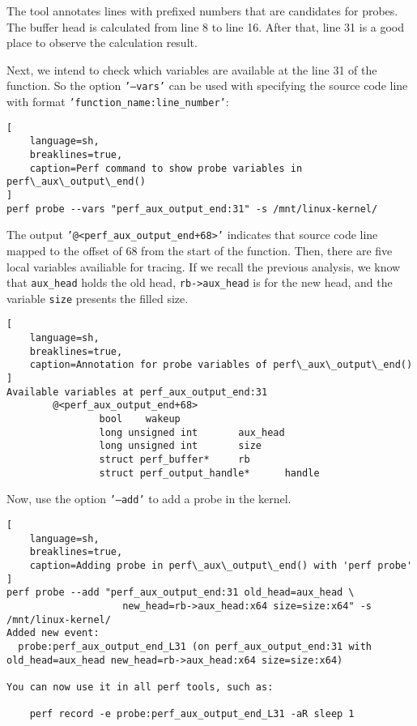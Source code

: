\documentclass[11pt]{diazessay} %
\def\code#1{\texttt{#1}}
\begin{document}
The tool annotates lines with prefixed numbers that are candidates for probes.
The buffer head is calculated from line 8 to line 16. After that, line 31 is a
good place to observe the calculation result.

Next, we intend to check which variables are available at the line 31 of the
function. So the option \code{'---vars'} can be used with specifying the
source code line with format \code{'function\_name:line\_number'}:

\begin{lstlisting}[
  	language=sh,
	breaklines=true,
	caption=Perf command to show probe variables in perf\_aux\_output\_end()
]
perf probe --vars "perf_aux_output_end:31" -s /mnt/linux-kernel/
\end{lstlisting}

The output \code{'@<perf\_aux\_output\_end+68>'} indicates that source code
line mapped to the offset of 68 from the start of the function. Then, there
are five local variables availiable for tracing. If we recall the previous
analysis, we know that \code{aux\_head} holds the old head,
\code{rb->aux\_head} is for the new head, and the variable \code{size}
presents the filled size.

\begin{lstlisting}[
  	language=sh,
	breaklines=true,
	caption=Annotation for probe variables of perf\_aux\_output\_end()
]
Available variables at perf_aux_output_end:31
        @<perf_aux_output_end+68>
                bool    wakeup
                long unsigned int       aux_head
                long unsigned int       size
                struct perf_buffer*     rb
                struct perf_output_handle*      handle
\end{lstlisting}

Now, use the option \code{'---add'} to add a probe in the kernel.

\begin{lstlisting}[
  	language=sh,
	breaklines=true,
	caption=Adding probe in perf\_aux\_output\_end() with 'perf probe'
]
perf probe --add "perf_aux_output_end:31 old_head=aux_head \
                    new_head=rb->aux_head:x64 size=size:x64" -s /mnt/linux-kernel/
Added new event:
  probe:perf_aux_output_end_L31 (on perf_aux_output_end:31 with old_head=aux_head new_head=rb->aux_head:x64 size=size:x64)

You can now use it in all perf tools, such as:

	perf record -e probe:perf_aux_output_end_L31 -aR sleep 1
\end{lstlisting}
\end{document}
